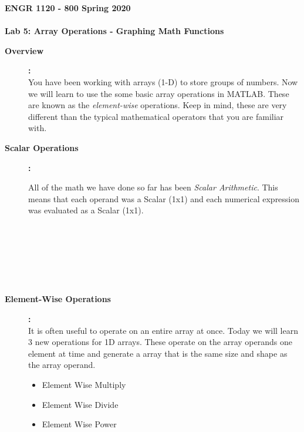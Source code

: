 \documentclass[11pt]{article}
\newcommand{\secNum}{1120 - 800}
\newcommand{\assnType}{Lab}
\newcommand{\assnTitle}{Array Operations - Graphing Math Functions}
\newcommand{\assnNum}{5}
\newcommand{\currTerm}{Spring 2020}
\begin{document}
    \textbf{\LARGE ENGR \hspace{2mm}\secNum \hspace{3mm} \currTerm} \\\\
    \textbf{\LARGE \assnType \hspace{1mm}  \assnNum : \assnTitle}

    \begin{description}
        
        \item [\textbf{Overview}]\textbf{:} \\
        
            You have been working with arrays (1-D) to store groups of numbers. Now we will learn to use the some basic array operations in MATLAB. These are known as the {\it element-wise} operations. Keep in mind, these are very different than the typical mathematical operators that you are familiar with.

	\item [\textbf{Scalar Operations}]\textbf{:} 
	
	All of the math we have done so far has been {\it Scalar Arithmetic}. This means that each operand was a Scalar (1x1) and each numerical expression was evaluated as a Scalar (1x1). \\
	
	  \\\\
	   \\
	  
	   \\\\
	   \\
		
	
	\item [\textbf{Element-Wise Operations}]\textbf{:} \\
	
	It is often useful to operate on an entire array at once. Today we will learn 3 new operations for 1D arrays. These operate on the array operands one element at time and generate a array that is the same size and shape as the array operand.
	\begin{itemize}
		\item Element Wise Multiply  \\
		\item Element Wise Divide  \\
		\item Element Wise Power  \\
		

\end{itemize}
\end{description}
\end{document}
